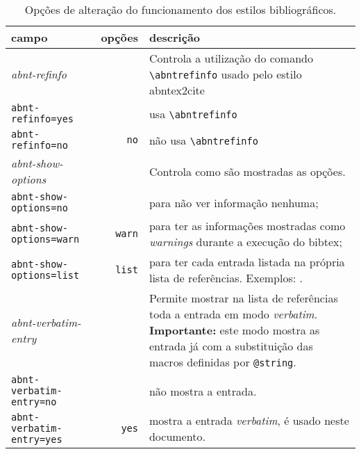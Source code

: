 \documentclass[a4paper]{ltxdoc}
\begin{document}
\begin{table}[htbp]

\caption[Opções de alteração dos estilos bibliográficos: funcionamento]{Opções de alteração do funcionamento dos estilos bibliográficos.}
\label{tabela-opcoes-funcionamento}
\begin{center}
	\begin{tabular}{lrp{6cm}}
		\toprule
		campo & opções & descrição \\ \midrule
		\emph{abnt-refinfo} & & Controla a utilização do comando
		\verb+\abntrefinfo+ usado pelo estilo \textsf{abntex2cite}\\
		\texttt{abnt-refinfo=yes} &\optiondefaultval{yes} & usa \verb+\abntrefinfo+ \\
		\texttt{abnt-refinfo=no} & \texttt{no} & não usa \verb+\abntrefinfo+
		\\ \midrule
		\emph{abnt-show-options} &  &
		Controla como são mostradas as opções. \\
		\texttt{abnt-show-options=no}& \optiondefaultval{no} & para não ver informação nenhuma; \\
		\texttt{abnt-show-options=warn}& \texttt{warn} & para ter as informações mostradas como
		\emph{warnings} durante a execução do \textsf{bibtex}; \\
		\texttt{abnt-show-options=list}& \texttt{list} & para ter
		cada entrada listada na própria lista de referências.
		Exemplos: \protect\citeonline{abnt-options0,abnt-options1,abnt-options2,abnt-options3,abnt-options4,abnt-options5,ABNT-final}.
		\\ \hline
		\emph{abnt-verbatim-entry} & & Permite mostrar na lista de referências toda
		a entrada em modo \emph{verbatim}.
		\textbf{Importante:} este modo mostra as entrada já com a
		substituição das macros definidas por \texttt{@string}.\\
		\texttt{abnt-verbatim-entry=no} &\optiondefaultval{no} & não mostra a entrada. \\
		\texttt{abnt-verbatim-entry=yes} & \texttt{yes} & mostra a entrada \emph{verbatim}, é
		usado neste documento.
		\\ \bottomrule
	\end{tabular}
\end{center}
\end{table}
\end{document}
